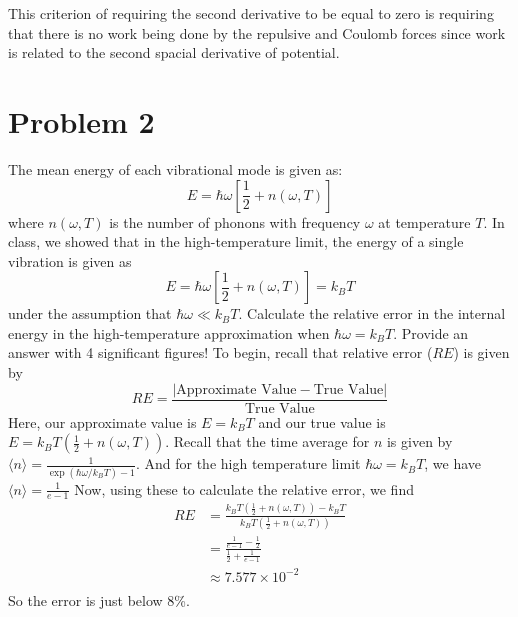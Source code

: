 \documentclass{article}
\begin{document}
This criterion of requiring the second derivative to be equal to zero is requiring that there is no work being done by the repulsive and Coulomb forces since work is related to the second spacial derivative of potential. 

\section*{Problem 2}
The mean energy of each vibrational mode is given as:
\[E = \hbar\omega\left[\frac{1}{2} + n(\omega, T)\right]\]
where $n(\omega, T)$ is the number of phonons with frequency $\omega$ at temperature $T$. In class, we showed that in the high-temperature limit, the energy of a single vibration is given as
\[E = \hbar\omega\left[\frac{1}{2} + n(\omega, T)\right] = k_BT\]
under the assumption that $\hbar\omega \ll k_BT$. Calculate the relative error in the internal energy in the high-temperature approximation when $\hbar\omega = k_BT$. Provide an answer with 4 significant figures!
\newline\newline
To begin, recall that relative error ($RE$) is given by
\[RE = \frac{|\text{Approximate Value} - \text{True Value}|}{\text{True Value}}\]
Here, our approximate value is $E = k_BT$ and our true value is $E = k_BT\left(\frac{1}{2} + n(\omega, T)\right)$. Recall that the time average for $n$ is given by $\langle n \rangle = \frac{1}{\exp{(\hbar\omega/k_BT)}-1}$. And for the high temperature limit $\hbar\omega = k_BT$, we have $\langle n \rangle = \frac{1}{e-1}$ Now, using these to calculate the relative error, we find
\begin{align*}
    RE &= \frac{k_BT(\frac{1}{2} + n(\omega, T)) - k_BT}{k_BT(\frac{1}{2} + n(\omega, T))} \\
    &= \frac{\frac{1}{e-1} - \frac{1}{2}}{\frac{1}{2} + \frac{1}{e - 1}} \\
    &\approx 7.577 \times 10^{-2} \\
\end{align*}
So the error is just below 8\%.
\end{document}

